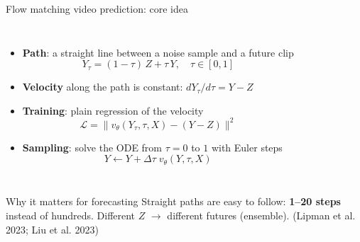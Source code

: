 \documentclass{beamer}
\begin{document}
\begin{frame}{Flow matching video prediction: core idea}
    \begin{columns}[c]
        \centering

        \scriptsize
        \begin{itemize}
            \item \textbf{Path}: a straight line between a noise sample and a future clip
            \[ Y_\tau = (1-\tau)\, Z + \tau\, Y, \quad \tau \in [0, 1] \]
            \item \textbf{Velocity} along the path is constant: $dY_\tau / d\tau = Y - Z$
            \item \textbf{Training}: plain regression of the velocity
            \[ \mathcal{L} = \lVert v_\theta(Y_\tau, \tau, X) - (Y - Z) \rVert^2 \]
            \item \textbf{Sampling}: solve the ODE from $\tau=0$ to $1$ with Euler steps
            \[ Y \leftarrow Y + \Delta\tau \; v_\theta(Y, \tau, X) \]
        \end{itemize}
    \end{columns}

    \begin{block}{Why it matters for forecasting}
        \scriptsize Straight paths are easy to follow: \textbf{1--20 steps} instead of hundreds. Different $Z$ $\rightarrow$ different futures (ensemble). \hfill{\tiny (Lipman et al. 2023; Liu et al. 2023)}
    \end{block}
\end{frame}
\end{document}
